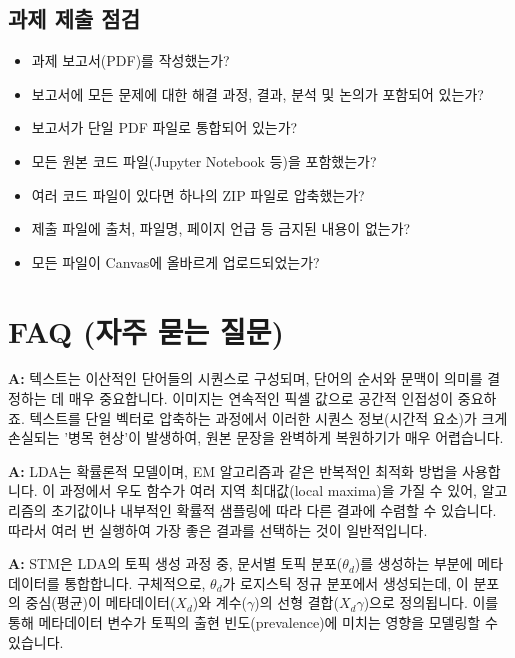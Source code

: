 \documentclass[11pt,a4paper]{article}
\begin{document}
\subsection*{과제 제출 점검}
\begin{itemize}
    \item 과제 보고서(PDF)를 작성했는가?
    \item 보고서에 모든 문제에 대한 해결 과정, 결과, 분석 및 논의가 포함되어 있는가?
    \item 보고서가 단일 PDF 파일로 통합되어 있는가?
    \item 모든 원본 코드 파일(Jupyter Notebook 등)을 포함했는가?
    \item 여러 코드 파일이 있다면 하나의 ZIP 파일로 압축했는가?
    \item 제출 파일에 출처, 파일명, 페이지 언급 등 금지된 내용이 없는가?
    \item 모든 파일이 Canvas에 올바르게 업로드되었는가?
\end{itemize}

\newpage
\section*{FAQ (자주 묻는 질문)}

\begin{tcolorbox}[title=Q: 텍스트 오토인코더가 이미지 오토인코더보다 어려운 이유는 무엇인가요?]
\textbf{A:} 텍스트는 이산적인 단어들의 시퀀스로 구성되며, 단어의 순서와 문맥이 의미를 결정하는 데 매우 중요합니다. 이미지는 연속적인 픽셀 값으로 공간적 인접성이 중요하죠. 텍스트를 단일 벡터로 압축하는 과정에서 이러한 시퀀스 정보(시간적 요소)가 크게 손실되는 '병목 현상'이 발생하여, 원본 문장을 완벽하게 복원하기가 매우 어렵습니다.
\end{tcolorbox}

\begin{tcolorbox}[title=Q: LDA는 왜 실행할 때마다 결과가 달라질 수 있나요?]
\textbf{A:} LDA는 확률론적 모델이며, EM 알고리즘과 같은 반복적인 최적화 방법을 사용합니다. 이 과정에서 우도 함수가 여러 지역 최대값(local maxima)을 가질 수 있어, 알고리즘의 초기값이나 내부적인 확률적 샘플링에 따라 다른 결과에 수렴할 수 있습니다. 따라서 여러 번 실행하여 가장 좋은 결과를 선택하는 것이 일반적입니다.
\end{tcolorbox}

\begin{tcolorbox}[title=Q: STM에서 메타데이터는 어떻게 토픽 모델링에 활용되나요?]
\textbf{A:} STM은 LDA의 토픽 생성 과정 중, 문서별 토픽 분포($\theta_d$)를 생성하는 부분에 메타데이터를 통합합니다. 구체적으로, $\theta_d$가 로지스틱 정규 분포에서 생성되는데, 이 분포의 중심(평균)이 메타데이터($X_d$)와 계수($\gamma$)의 선형 결합($X_d \gamma$)으로 정의됩니다. 이를 통해 메타데이터 변수가 토픽의 출현 빈도(prevalence)에 미치는 영향을 모델링할 수 있습니다.
\end{tcolorbox}
\end{document}
